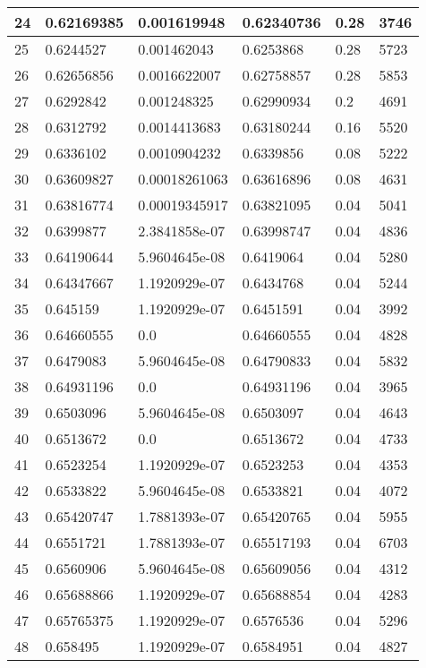 \begin{longtable}{|l|l|l|l|l|l|}
24 & 0.62169385 & 0.001619948 & 0.62340736 & 0.28 & 3746 \\ \hline 
25 & 0.6244527 & 0.001462043 & 0.6253868 & 0.28 & 5723 \\ \hline 
26 & 0.62656856 & 0.0016622007 & 0.62758857 & 0.28 & 5853 \\ \hline 
27 & 0.6292842 & 0.001248325 & 0.62990934 & 0.2 & 4691 \\ \hline 
28 & 0.6312792 & 0.0014413683 & 0.63180244 & 0.16 & 5520 \\ \hline 
29 & 0.6336102 & 0.0010904232 & 0.6339856 & 0.08 & 5222 \\ \hline 
30 & 0.63609827 & 0.00018261063 & 0.63616896 & 0.08 & 4631 \\ \hline 
31 & 0.63816774 & 0.00019345917 & 0.63821095 & 0.04 & 5041 \\ \hline 
32 & 0.6399877 & 2.3841858e-07 & 0.63998747 & 0.04 & 4836 \\ \hline 
33 & 0.64190644 & 5.9604645e-08 & 0.6419064 & 0.04 & 5280 \\ \hline 
34 & 0.64347667 & 1.1920929e-07 & 0.6434768 & 0.04 & 5244 \\ \hline 
35 & 0.645159 & 1.1920929e-07 & 0.6451591 & 0.04 & 3992 \\ \hline 
36 & 0.64660555 & 0.0 & 0.64660555 & 0.04 & 4828 \\ \hline 
37 & 0.6479083 & 5.9604645e-08 & 0.64790833 & 0.04 & 5832 \\ \hline 
38 & 0.64931196 & 0.0 & 0.64931196 & 0.04 & 3965 \\ \hline 
39 & 0.6503096 & 5.9604645e-08 & 0.6503097 & 0.04 & 4643 \\ \hline 
40 & 0.6513672 & 0.0 & 0.6513672 & 0.04 & 4733 \\ \hline 
41 & 0.6523254 & 1.1920929e-07 & 0.6523253 & 0.04 & 4353 \\ \hline 
42 & 0.6533822 & 5.9604645e-08 & 0.6533821 & 0.04 & 4072 \\ \hline 
43 & 0.65420747 & 1.7881393e-07 & 0.65420765 & 0.04 & 5955 \\ \hline 
44 & 0.6551721 & 1.7881393e-07 & 0.65517193 & 0.04 & 6703 \\ \hline 
45 & 0.6560906 & 5.9604645e-08 & 0.65609056 & 0.04 & 4312 \\ \hline 
46 & 0.65688866 & 1.1920929e-07 & 0.65688854 & 0.04 & 4283 \\ \hline 
47 & 0.65765375 & 1.1920929e-07 & 0.6576536 & 0.04 & 5296 \\ \hline 
48 & 0.658495 & 1.1920929e-07 & 0.6584951 & 0.04 & 4827 \\ \hline 

\end{longtable}
